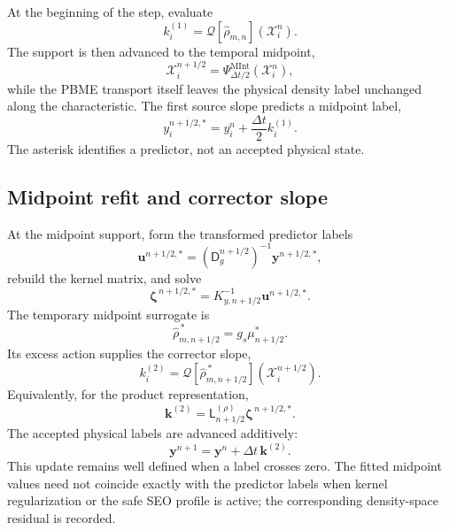 \documentclass[
  11pt,
  letterpaper,
  onehalfspacing,
  normalmargins,
  equalmargins,
  oneside
]{ut-thesis}
\begin{document}
At the beginning of the step, evaluate
\begin{equation}
 k_i^{(1)}
 =
 \mathcal Q[\widehat\rho_{m,n}]
 \left(\boldsymbol{\mathcal X}_i^n\right).
\label{eq:ch5-first-source-slope}
\end{equation}
The support is then advanced to the temporal midpoint,
\begin{equation}
\boldsymbol{\mathcal X}_i^{n+1/2}
=
\Psi_{\Delta t/2}^{\mathrm{MInt}}
\left(\boldsymbol{\mathcal X}_i^n\right),
\label{eq:ch5-first-half-step}
\end{equation}
while the PBME transport itself leaves the physical density label unchanged
along the characteristic. The first source slope predicts a midpoint label,
\begin{equation}
 y_i^{n+1/2,*}
 =
 y_i^n+\frac{\Delta t}{2}k_i^{(1)}.
\label{eq:ch5-midpoint-label-predictor}
\end{equation}
The asterisk identifies a predictor, not an accepted physical state.

\subsection{Midpoint refit and corrector slope}
\label{subsec:ch5-middle-source-leg}

At the midpoint support, form the transformed predictor labels
\begin{equation}
\mathbf u^{n+1/2,*}
=
\left(\mathsf D_g^{n+1/2}\right)^{-1}
\mathbf y^{n+1/2,*},
\label{eq:ch5-midpoint-ratio-labels}
\end{equation}
rebuild the kernel matrix, and solve
\begin{equation}
 \boldsymbol\zeta^{\,n+1/2,*}
 =
 K_{y,n+1/2}^{-1}\mathbf u^{n+1/2,*}.
\label{eq:ch5-midpoint-predictor-coefficients}
\end{equation}
The temporary midpoint surrogate is
\begin{equation}
 \widehat\rho_{m,n+1/2}^{\,*}
 =
 g_s\mu_{n+1/2}^{*}.
\label{eq:ch5-midpoint-predictor-surrogate}
\end{equation}
Its excess action supplies the corrector slope,
\begin{equation}
 k_i^{(2)}
 =
 \mathcal Q[
 \widehat\rho_{m,n+1/2}^{\,*}]
 \left(\boldsymbol{\mathcal X}_i^{n+1/2}\right).
\label{eq:ch5-second-source-slope}
\end{equation}
Equivalently, for the product representation,
\begin{equation}
 \mathbf k^{(2)}
 =
 \mathsf L_{n+1/2}^{(\rho)}
 \boldsymbol\zeta^{\,n+1/2,*}.
\label{eq:ch5-midpoint-collocated-source}
\end{equation}
The accepted physical labels are advanced additively:
\begin{equation}
 \mathbf y^{n+1}
 =
 \mathbf y^n+\Delta t\,\mathbf k^{(2)}.
\label{eq:ch5-source-leg-update}
\end{equation}
This update remains well defined when a label crosses zero. The fitted
midpoint values need not coincide exactly with the predictor labels when
kernel regularization or the safe SEO profile is active; the corresponding
density-space residual is recorded.
\end{document}
